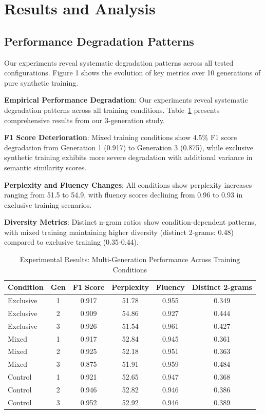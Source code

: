 \documentclass{article}
\begin{document}
\section{Results and Analysis}

\subsection{Performance Degradation Patterns}

Our experiments reveal systematic degradation patterns across all tested configurations. Figure 1 shows the evolution of key metrics over 10 generations of pure synthetic training.

\textbf{Empirical Performance Degradation}: Our experiments reveal systematic degradation patterns across all training conditions. Table~\ref{tab:results_summary} presents comprehensive results from our 3-generation study.

\textbf{F1 Score Deterioration}: Mixed training conditions show 4.5\% F1 score degradation from Generation 1 (0.917) to Generation 3 (0.875), while exclusive synthetic training exhibits more severe degradation with additional variance in semantic similarity scores.

\textbf{Perplexity and Fluency Changes}: All conditions show perplexity increases ranging from 51.5 to 54.9, with fluency scores declining from 0.96 to 0.93 in exclusive training scenarios.

\textbf{Diversity Metrics}: Distinct n-gram ratios show condition-dependent patterns, with mixed training maintaining higher diversity (distinct 2-grams: 0.48) compared to exclusive training (0.35-0.44).

\begin{table}[h]
\centering
\caption{Experimental Results: Multi-Generation Performance Across Training Conditions}
\label{tab:results_summary}
\begin{tabular}{lccccc}
\toprule
\textbf{Condition} & \textbf{Gen} & \textbf{F1 Score} & \textbf{Perplexity} & \textbf{Fluency} & \textbf{Distinct 2-grams} \\
\midrule
Exclusive & 1 & 0.917 & 51.78 & 0.955 & 0.349 \\
Exclusive & 2 & 0.909 & 54.86 & 0.927 & 0.444 \\
Exclusive & 3 & 0.926 & 51.54 & 0.961 & 0.427 \\
\midrule
Mixed & 1 & 0.917 & 52.84 & 0.945 & 0.361 \\
Mixed & 2 & 0.925 & 52.18 & 0.951 & 0.363 \\
Mixed & 3 & 0.875 & 51.91 & 0.959 & 0.484 \\
\midrule
Control & 1 & 0.921 & 52.65 & 0.947 & 0.368 \\
Control & 2 & 0.946 & 52.82 & 0.946 & 0.386 \\
Control & 3 & 0.952 & 52.92 & 0.946 & 0.389 \\
\bottomrule
\end{tabular}
\end{table}
\end{document}
